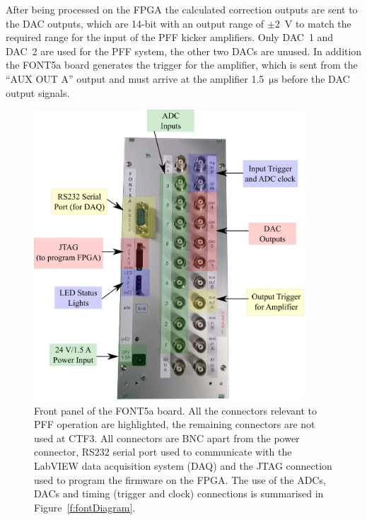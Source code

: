 After being processed on the FPGA the calculated correction outputs are sent to the DAC outputs, which are 14-bit with an output range of \(\pm2\)~V to match the required range for the input of the PFF kicker amplifiers. Only DAC~1 and DAC~2 are used for the PFF system, the other two DACs are unused. In addition the FONT5a board generates the trigger for the amplifier, which is sent from the ``AUX OUT A'' output and must arrive at the amplifier 1.5~\(\mathrm{\mu s}\) before the DAC output signals.

\begin{figure}
  \centering
  \includegraphics[width=0.9\textwidth]{Figures/commissioning/FONT5aPanelPic}
  \caption{Front panel of the FONT5a board. All the connectors relevant to PFF operation are highlighted, the remaining connectors are not used at CTF3. All connectors are BNC apart from the power connector, RS232 serial port used to communicate with the LabVIEW data acquisition system (DAQ) and the JTAG connection used to program the firmware on the FPGA. The use of the ADCs, DACs and timing (trigger and clock) connections is summarised in Figure~\ref{f:fontDiagram}. }
  \label{f:FONT5aPanelPic}
\end{figure}

